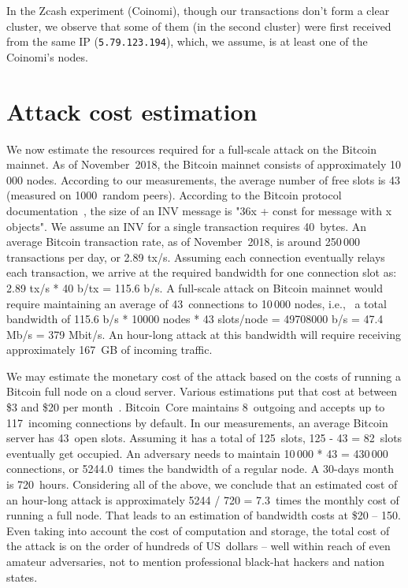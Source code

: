 In the Zcash experiment (Coinomi), though our transactions don't form a clear cluster, we observe that some of them (in the second cluster) were first received from the same IP (\texttt{5.79.123.194}), which, we assume, is at least one of the Coinomi's nodes.



\section{Attack cost estimation}

We now estimate the resources required for a full-scale attack on the Bitcoin mainnet.
As of November~2018, the Bitcoin mainnet consists of approximately 10\,000 nodes.
According to our measurements, the average number of free slots is 43 (measured on 1000~random peers).
According to the Bitcoin protocol documentation~\cite{BitcoinWiki}, the size of an INV message is "36x + const for message with x objects".
We assume an INV for a single transaction requires 40~bytes.
An average Bitcoin transaction rate, as of November~2018, is around 250\,000 transactions per day, or 2.89 tx/s.
Assuming each connection eventually relays each transaction, we arrive at the required bandwidth for one connection slot as: 2.89 tx/s * 40 b/tx = 115.6 b/s.
A full-scale attack on Bitcoin mainnet would require maintaining an average of 43~connections to 10\,000 nodes, i.e.,~ a total bandwidth of 115.6 b/s * 10000 nodes * 43 slots/node = 49708000 b/s = 47.4 Mb/s = 379 Mbit/s.
An hour-long attack at this bandwidth will require receiving approximately 167~GB of incoming traffic.

We may estimate the monetary cost of the attack based on the costs of running a Bitcoin full node on a cloud server.
Various estimations put that cost at between \$3 and \$20 per month~\cite{Zeyde2018, Connell2017}.
Bitcoin~Core maintains 8~outgoing and accepts up to 117~incoming connections by default.
In our measurements, an average Bitcoin server has 43~open slots.
Assuming it has a total of 125~slots, 125 - 43 = 82~slots eventually get occupied.
An adversary needs to maintain 10\,000 * 43 = 430\,000 connections, or 5244.0~times the bandwidth of a regular node.
A 30-days month is 720~hours.
Considering all of the above, we conclude that an estimated cost of an hour-long attack is approximately 5244 / 720 = 7.3~times the monthly cost of running a full node.
That leads to an estimation of bandwidth costs at \$20 -- 150.
Even taking into account the cost of computation and storage, the total cost of the attack is on the order of hundreds of US~dollars -- well within reach of even amateur adversaries, not to mention professional black-hat hackers and nation states.

